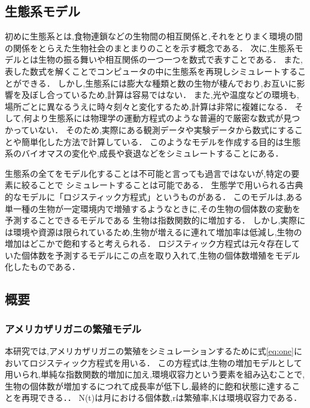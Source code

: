 \documentclass[12pt,a4j,titlepage]{ltjsarticle}
\begin{document}
\subsection{生態系モデル}
初めに生態系とは,食物連鎖などの生物間の相互関係と,それをとりまく環境の間の関係をとらえた生物社会のまとまりのことを示す概念である．
次に,生態系モデルとは生物の振る舞いや相互関係の一つ一つを数式で表すことである．
また,表した数式を解くことでコンピュータの中に生態系を再現しシミュレートすることができる．
しかし,生態系には膨大な種類と数の生物が棲んでおり,お互いに影響を及ぼし合っているため,計算は容易ではない．
また,光や温度などの環境も,場所ごとに異なるうえに時々刻々と変化するため,計算は非常に複雑になる．
そして,何より生態系には物理学の運動方程式のような普遍的で厳密な数式が見つかっていない．
そのため,実際にある観測データや実験データから数式にすることや簡単化した方法で計算している．
このようなモデルを作成する目的は生態系のバイオマスの変化や,成長や衰退などをシミュレートすることにある．

生態系の全てをモデル化することは不可能と言っても過言ではないが,特定の要素に絞ることで
シミュレートすることは可能である．
生態学で用いられる古典的なモデルに「ロジスティック方程式」というものがある．
このモデルは,ある単一種の生物が一定環境内で増殖するようなときに,その生物の個体数の変動を予測することできるモデルである
生物は指数関数的に増加する．
しかし,実際には環境や資源は限られているため,生物が増えるに連れて増加率は低減し,生物の増加はどこかで飽和すると考えられる．
ロジスティック方程式は元々存在していた個体数を予測するモデルにこの点を取り入れて,生物の個体数増殖をモデル化したものである．


\subsection{概要}
\subsubsection{アメリカザリガニの繁殖モデル}
本研究では,アメリカザリガニの繁殖をシミュレーションするために式\eqref{eq:one}においてロジスティック方程式を用いる．
この方程式は,生物の増加モデルとして用いられ,単純な指数関数的増加に加え,環境収容力という要素を組み込むことで,生物の個体数が増加するにつれて成長率が低下し,最終的に飽和状態に達することを再現できる．\cite{log}．
N(t)は月における個体数,rは繁殖率,Kは環境収容力である．
\end{document}
